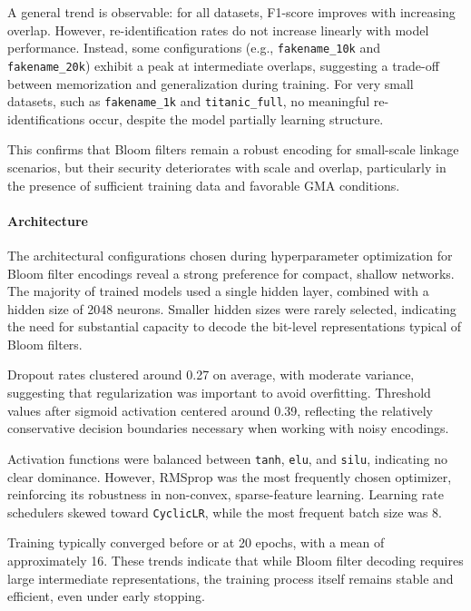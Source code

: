 A general trend is observable: for all datasets, F1-score improves with increasing overlap. However, re-identification rates do not increase linearly with model performance. Instead, some configurations (e.g., \texttt{fakename\_10k} and \texttt{fakename\_20k}) exhibit a peak at intermediate overlaps, suggesting a trade-off between memorization and generalization during training. For very small datasets, such as \texttt{fakename\_1k} and \texttt{titanic\_full}, no meaningful re-identifications occur, despite the model partially learning structure.

This confirms that Bloom filters remain a robust encoding for small-scale linkage scenarios, but their security deteriorates with scale and overlap, particularly in the presence of sufficient training data and favorable GMA conditions.

\paragraph{Architecture}

The architectural configurations chosen during hyperparameter optimization for Bloom filter encodings reveal a strong preference for compact, shallow networks. The majority of trained models used a single hidden layer, combined with a hidden size of 2048 neurons. Smaller hidden sizes were rarely selected, indicating the need for substantial capacity to decode the bit-level representations typical of Bloom filters.

Dropout rates clustered around 0.27 on average, with moderate variance, suggesting that regularization was important to avoid overfitting. Threshold values after sigmoid activation centered around 0.39, reflecting the relatively conservative decision boundaries necessary when working with noisy encodings.

Activation functions were balanced between \texttt{tanh}, \texttt{elu}, and \texttt{silu}, indicating no clear dominance. However, RMSprop was the most frequently chosen optimizer, reinforcing its robustness in non-convex, sparse-feature learning. Learning rate schedulers skewed toward \texttt{CyclicLR}, while the most frequent batch size was 8.

Training typically converged before or at 20 epochs, with a mean of approximately 16. These trends indicate that while Bloom filter decoding requires large intermediate representations, the training process itself remains stable and efficient, even under early stopping.

